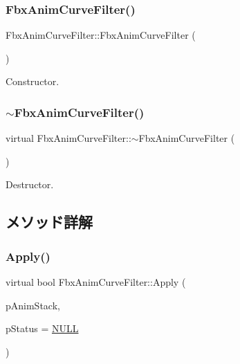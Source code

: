 \subsubsection{\texorpdfstring{Fbx\+Anim\+Curve\+Filter()}{FbxAnimCurveFilter()}}
{\footnotesize\ttfamily Fbx\+Anim\+Curve\+Filter\+::\+Fbx\+Anim\+Curve\+Filter (\begin{DoxyParamCaption}{ }\end{DoxyParamCaption})}



Constructor. 

\mbox{\label{class_fbx_anim_curve_filter_adafe5c10e506cabca6410869f53602bc}} 
\subsubsection{\texorpdfstring{$\sim$\+Fbx\+Anim\+Curve\+Filter()}{~FbxAnimCurveFilter()}}
{\footnotesize\ttfamily virtual Fbx\+Anim\+Curve\+Filter\+::$\sim$\+Fbx\+Anim\+Curve\+Filter (\begin{DoxyParamCaption}{ }\end{DoxyParamCaption})\hspace{0.3cm}{\ttfamily [virtual]}}



Destructor. 



\subsection{メソッド詳解}
\mbox{\label{class_fbx_anim_curve_filter_aef3900e6180e05661c27ee484ae939c3}} 
\subsubsection{\texorpdfstring{Apply()}{Apply()}\hspace{0.1cm}{\footnotesize\ttfamily [1/5]}}
{\footnotesize\ttfamily virtual bool Fbx\+Anim\+Curve\+Filter\+::\+Apply (\begin{DoxyParamCaption}\item[{\hyperlink{class_fbx_anim_stack}{Fbx\+Anim\+Stack} $\ast$}]{p\+Anim\+Stack,  }\item[{\hyperlink{class_fbx_status}{Fbx\+Status} $\ast$}]{p\+Status = {\ttfamily \hyperlink{fbxarch_8h_a070d2ce7b6bb7e5c05602aa8c308d0c4}{N\+U\+LL}} }\end{DoxyParamCaption})\hspace{0.3cm}{\ttfamily [virtual]}}

